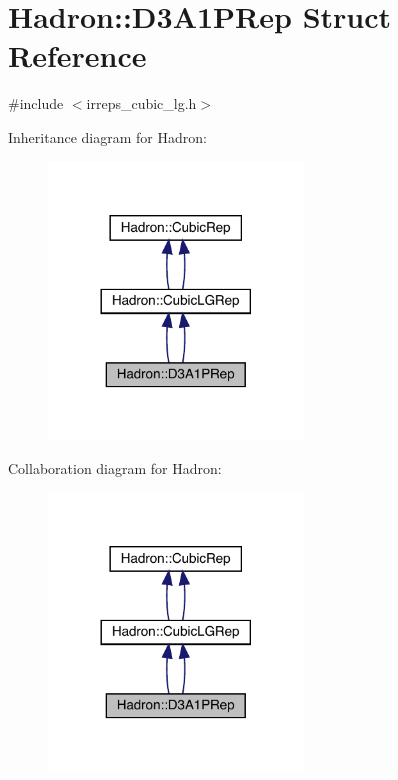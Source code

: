 \hypertarget{structHadron_1_1D3A1PRep}{}\section{Hadron\+:\+:D3\+A1\+P\+Rep Struct Reference}
\label{structHadron_1_1D3A1PRep}


{\ttfamily \#include $<$irreps\+\_\+cubic\+\_\+lg.\+h$>$}



Inheritance diagram for Hadron\+:\nopagebreak
\begin{figure}[H]
\begin{center}
\leavevmode
\includegraphics[width=192pt]{d0/d3f/structHadron_1_1D3A1PRep__inherit__graph}
\end{center}
\end{figure}


Collaboration diagram for Hadron\+:\nopagebreak
\begin{figure}[H]
\begin{center}
\leavevmode
\includegraphics[width=192pt]{de/da2/structHadron_1_1D3A1PRep__coll__graph}
\end{center}
\end{figure}
